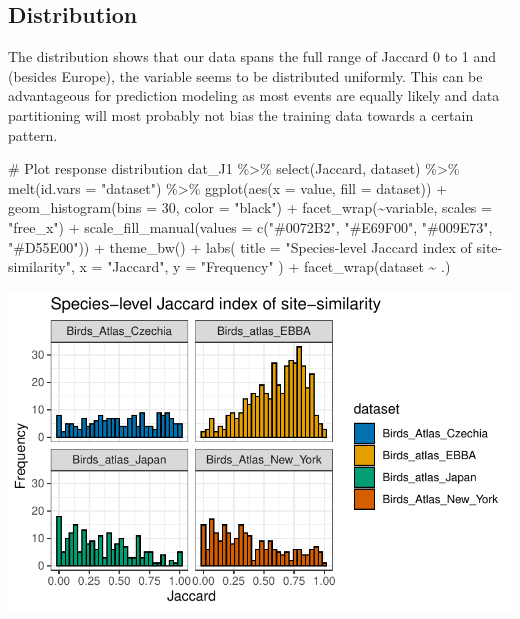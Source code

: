 \documentclass[
  letterpaper,
  DIV=11,
  numbers=noendperiod]{scrreprt}
\newenvironment{Shaded}{\begin{snugshade}}{\end{snugshade}}
\newcommand{\AttributeTok}[1]{\textcolor[rgb]{0.40,0.45,0.13}{#1}}
\newcommand{\CommentTok}[1]{\textcolor[rgb]{0.37,0.37,0.37}{#1}}
\newcommand{\DecValTok}[1]{\textcolor[rgb]{0.68,0.00,0.00}{#1}}
\newcommand{\FunctionTok}[1]{\textcolor[rgb]{0.28,0.35,0.67}{#1}}
\newcommand{\NormalTok}[1]{\textcolor[rgb]{0.00,0.23,0.31}{#1}}
\newcommand{\SpecialCharTok}[1]{\textcolor[rgb]{0.37,0.37,0.37}{#1}}
\newcommand{\StringTok}[1]{\textcolor[rgb]{0.13,0.47,0.30}{#1}}
\begin{document}
\subsection{Distribution}

The distribution shows that our data spans the full range of Jaccard 0
to 1 and (besides Europe), the variable seems to be distributed
uniformly. This can be advantageous for prediction modeling as most
events are equally likely and data partitioning will most probably not
bias the training data towards a certain pattern.

\begin{Shaded}
\begin{Highlighting}[]
\CommentTok{\# Plot response distribution}
\NormalTok{dat\_J1 }\SpecialCharTok{\%\textgreater{}\%}
    \FunctionTok{select}\NormalTok{(Jaccard, dataset) }\SpecialCharTok{\%\textgreater{}\%}
    \FunctionTok{melt}\NormalTok{(}\AttributeTok{id.vars =} \StringTok{"dataset"}\NormalTok{) }\SpecialCharTok{\%\textgreater{}\%}
    \FunctionTok{ggplot}\NormalTok{(}\FunctionTok{aes}\NormalTok{(}\AttributeTok{x =}\NormalTok{ value, }\AttributeTok{fill =}\NormalTok{ dataset)) }\SpecialCharTok{+}
    \FunctionTok{geom\_histogram}\NormalTok{(}\AttributeTok{bins =} \DecValTok{30}\NormalTok{, }\AttributeTok{color =} \StringTok{"black"}\NormalTok{) }\SpecialCharTok{+}
    \FunctionTok{facet\_wrap}\NormalTok{(}\SpecialCharTok{\textasciitilde{}}\NormalTok{variable, }\AttributeTok{scales =} \StringTok{"free\_x"}\NormalTok{) }\SpecialCharTok{+}
    \FunctionTok{scale\_fill\_manual}\NormalTok{(}\AttributeTok{values =} \FunctionTok{c}\NormalTok{(}\StringTok{"\#0072B2"}\NormalTok{, }\StringTok{"\#E69F00"}\NormalTok{, }\StringTok{"\#009E73"}\NormalTok{, }\StringTok{"\#D55E00"}\NormalTok{)) }\SpecialCharTok{+}
    \FunctionTok{theme\_bw}\NormalTok{() }\SpecialCharTok{+}
    \FunctionTok{labs}\NormalTok{(}
        \AttributeTok{title =} \StringTok{"Species{-}level Jaccard index of site{-}similarity"}\NormalTok{,}
        \AttributeTok{x =} \StringTok{"Jaccard"}\NormalTok{,}
        \AttributeTok{y =} \StringTok{"Frequency"}
\NormalTok{    ) }\SpecialCharTok{+}
    \FunctionTok{facet\_wrap}\NormalTok{(dataset }\SpecialCharTok{\textasciitilde{}}\NormalTok{ .)}
\end{Highlighting}
\end{Shaded}

\includegraphics{01_DataPrep_files/figure-pdf/unnamed-chunk-9-1.pdf}
\end{document}
